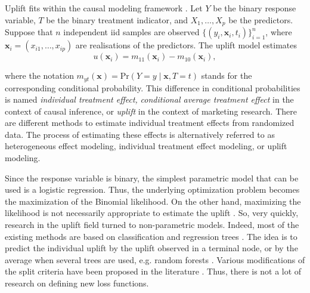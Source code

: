 \documentclass{article}
\def\x{\mathbf x}
\begin{document}
Uplift fits within the causal modeling framework \citep{rubin1974estimating, holland1986statistics}. Let $Y$ be the binary response variable, $T$ be the binary  treatment indicator, and $X_1,\ldots,X_p$ be the predictors. Suppose that $n$ independent iid samples  are observed $\{(y_i, \textbf{x}_i, t_i)\}_{i=1}^n$, where $\x_i = (x_{i1}, \ldots, x_{ip})$ are realisations of the predictors. The uplift model estimates
\begin{equation*}
u (\textbf{x}_i)= m_{11}(\x_i) - m_{10}(\x_i),
\end{equation*}

where the notation $m_{yt}(\x) = \mathrm{Pr}(Y = y \mid \x ,T=t)$ stands for the corresponding conditional probability. This difference in conditional probabilities is named  \emph{individual treatment effect,} \emph{conditional average treatment effect} in the context of causal inference, or \emph{uplift} in the context of marketing research. There are different  methods to estimate individual treatment effects from randomized data. The process of estimating these effects is alternatively referred to as heterogeneous effect modeling, individual treatment effect modeling, or uplift modeling. 


Since the response variable is binary, the simplest parametric model that can be used is a logistic regression. Thus, the underlying optimization problem becomes the maximization of the Binomial likelihood. On the other hand, maximizing the likelihood is not necessarily appropriate to estimate the uplift \citep{belba2019qbased}. So, very quickly, research in the uplift field turned to non-parametric models. Indeed, most of the existing methods are based on classification and regression trees \citep{breiman1984classification}. The idea is to predict the individual uplift by the uplift observed in a terminal node, or by the average when several trees are used, e.g. random forests \citep{Breiman-RandomForest-2001}. Various modifications of the split criteria have been proposed in the literature \citep{radcliffe1999differential, hansotia2002incremental, hansotia2002direct, jaskowski2012uplift, radcliffe2011real}. Thus, there is not a lot of research on defining new loss functions. 
\end{document}
